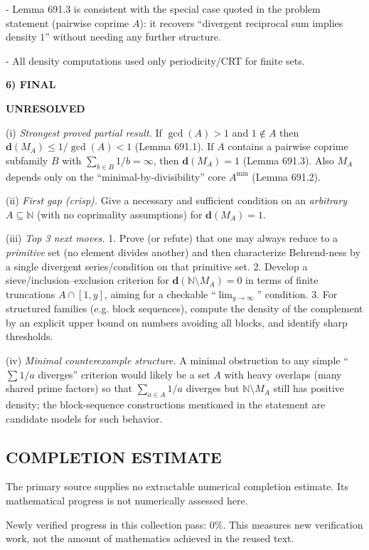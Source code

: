 - Lemma 691.3 is consistent with the special case quoted in the problem statement (pairwise coprime $A$): it recovers “divergent reciprocal sum implies density $1$” without needing any further structure.

- All density computations used only periodicity/CRT for finite sets.

\bigskip
\noindent\textbf{6) FINAL}

\textbf{UNRESOLVED}

(i) \emph{Strongest proved partial result.} If $\gcd(A)>1$ and $1\notin A$ then $\mathbf{d}(M_A)\le 1/\gcd(A)<1$ (Lemma 691.1). If $A$ contains a pairwise coprime subfamily $B$ with $\sum_{b\in B}1/b=\infty$, then $\mathbf{d}(M_A)=1$ (Lemma 691.3). Also $M_A$ depends only on the “minimal-by-divisibility” core $A^{\min}$ (Lemma 691.2).

(ii) \emph{First gap (crisp).} Give a necessary and sufficient condition on an \emph{arbitrary} $A\subseteq\mathbb{N}$ (with no coprimality assumptions) for $\mathbf{d}(M_A)=1$.

(iii) \emph{Top 3 next moves.}
1. Prove (or refute) that one may always reduce to a \emph{primitive} set (no element divides another) and then characterize Behrend-ness by a single divergent series/condition on that primitive set.
2. Develop a sieve/inclusion--exclusion criterion for $\mathbf{d}(\mathbb{N}\setminus M_A)=0$ in terms of finite truncations $A\cap[1,y]$, aiming for a checkable “$\lim_{y\to\infty}$” condition.
3. For structured families (e.g. block sequences), compute the density of the complement by an explicit upper bound on numbers avoiding all blocks, and identify sharp thresholds.

(iv) \emph{Minimal counterexample structure.} A minimal obstruction to any simple “$\sum 1/a$ diverges” criterion would likely be a set $A$ with heavy overlaps (many shared prime factors) so that $\sum_{a\in A}1/a$ diverges but $\mathbb{N}\setminus M_A$ still has positive density; the block-sequence constructions mentioned in the statement are candidate models for such behavior.




\subsection*{COMPLETION ESTIMATE}
The primary source supplies no extractable numerical completion estimate. Its mathematical progress is not numerically assessed here.

Newly verified progress in this collection pass: $0\%$. This measures new verification work, not the amount of mathematics achieved in the reused text.

